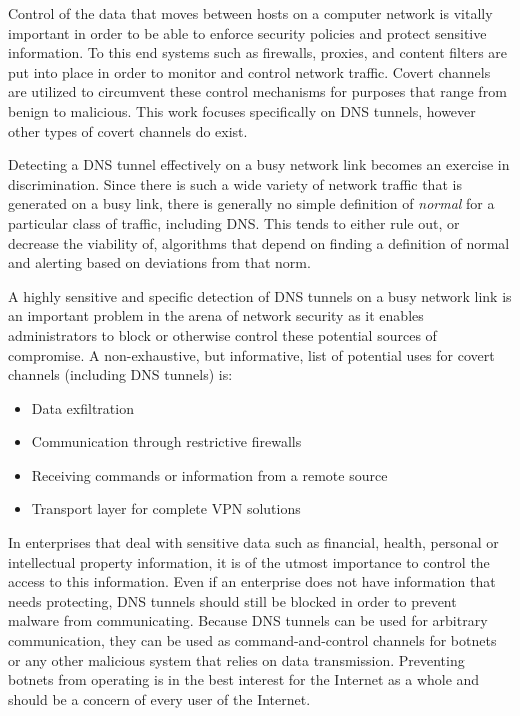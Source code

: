 \documentclass[12pt]{report}
\theoremstyle{remark}
\theoremstyle{definition}
\theoremstyle{definition}
\theoremstyle{definition}
\begin{document}
Control of the data that moves between hosts on a computer network is vitally
important in order to be able to enforce security policies and protect sensitive
information. To this end systems such as firewalls, proxies, and content filters
are put into place in order to monitor and control network traffic. Covert
channels are utilized to circumvent these control mechanisms for purposes that
range from benign to malicious. This work focuses specifically on DNS tunnels,
however other types of covert channels do exist.

Detecting a DNS tunnel effectively on a busy network link becomes an exercise in
discrimination. Since there is such a wide variety of network traffic that is
generated on a busy link, there is generally no simple definition of
\emph{normal} for a particular class of traffic, including DNS. This tends to
either rule out, or decrease the viability of, algorithms that depend on finding
a definition of normal and alerting based on deviations from that norm.

A highly sensitive and specific detection of DNS tunnels on a busy network link
is an important problem in the arena of network security as it enables
administrators to block or otherwise control these potential sources of
compromise. A non-exhaustive, but informative, list of potential uses for covert
channels (including DNS tunnels) is:

\begin{itemize} \item Data exfiltration \item Communication through restrictive
firewalls \item Receiving commands or information from a remote source \item
Transport layer for complete VPN solutions \end{itemize}

In enterprises that deal with sensitive data such as financial, health,
personal or intellectual property information, it is of the utmost importance to
control the access to this information. Even if an enterprise does not have
information that needs protecting, DNS tunnels should still be blocked in order
to prevent malware from communicating\cite{Dietrich2011}. Because DNS tunnels can be used for
arbitrary communication, they can be used as command-and-control channels for
botnets\cite{WolAlphaBotnet} or any other malicious system that relies on data transmission.
Preventing botnets from operating is in the best interest for the Internet as a
whole and should be a concern of every user of the Internet.
\end{document}
